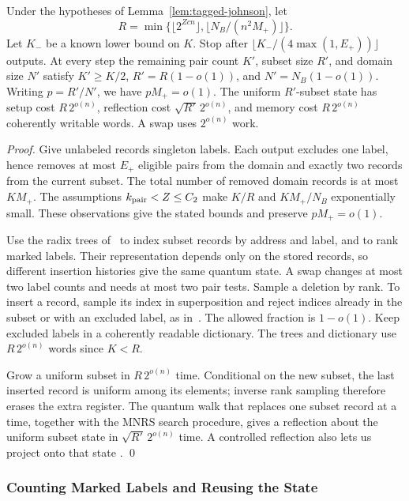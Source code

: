 \documentclass[runningheads,envcountsame,envcountsect,orivec]{llncs}
\begin{document}
\begin{lemma}
\label{lem:reporter-state}
Under the hypotheses of Lemma~\ref{lem:tagged-johnson}, let
\[
 R=\min\{\lfloor2^{Zcn}\rfloor,
          \lfloor N_B/(n^2M_+)\rfloor\}.
\]
Let $K_-$ be a known lower bound on $K$. Stop after
$\lfloor K_-/(4\max(1,E_+))\rfloor$ outputs. At every step the
remaining pair count $K'$, subset size $R'$, and domain size
$N'$ satisfy
$K'\ge K/2$, $R'=R(1-o(1))$, and $N'=N_B(1-o(1))$.
Writing $p=R'/N'$, we have $pM_+=o(1)$.
The uniform $R'$-subset state has setup cost $R\,2^{o(n)}$,
reflection cost $\sqrt{R'}\,2^{o(n)}$, and memory cost
$R\,2^{o(n)}$ coherently writable words. A swap uses
$2^{o(n)}$ work.
\end{lemma}

\begin{proof}
Give unlabeled records singleton labels. Each output excludes
one label, hence removes at most $E_+$ eligible pairs from
the domain and exactly two records from the current subset.
The total number of removed domain records is at most
$KM_+$. The assumptions $k_{\rm pair}<Z\le C_2$ make
$K/R$ and $KM_+/N_B$ exponentially small. These observations
give the stated bounds and preserve $pM_+=o(1)$.

Use the radix trees of~\cite[Section~5]{BCSS23} to index subset
records by address and label, and to rank marked labels. Their
representation depends only on the stored records, so different
insertion histories give the same quantum state. A swap changes at
most two label counts and needs at most two pair tests.
Sample a deletion by rank. To insert a record, sample its index
in superposition and reject indices already in the subset or
with an excluded label, as in~\cite[Lemma~6]{BLSS25}. The allowed
fraction is $1-o(1)$. Keep excluded labels in a coherently
readable dictionary. The trees and dictionary use
$R\,2^{o(n)}$ words since $K<R$.

Grow a uniform subset in $R\,2^{o(n)}$ time. Conditional on
the new subset, the last inserted record is uniform among
its elements; inverse rank sampling therefore erases the
extra register. The quantum walk that replaces one subset
record at a time, together with the MNRS search procedure,
gives a reflection about the uniform subset state in
$\sqrt{R'}\,2^{o(n)}$ time. A controlled reflection also lets
us project onto that state
\cite[Theorem~6]{MNRS11}.
\qed
\end{proof}

\subsubsection{Counting Marked Labels and Reusing the State}
\end{document}
